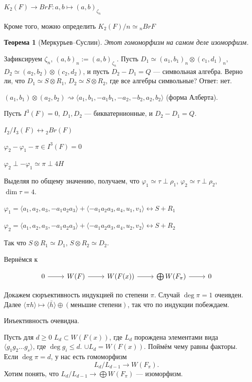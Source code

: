 \documentclass{article}
\newenvironment{cd}{\begin{equation*}\begin{tikzcd}}{\end{tikzcd}\end{equation*}}
\newtheorem*{theorem}{Теорема}
\theoremstyle{definition}
\theoremstyle{remark}
\begin{document}
$K_2(F) \rightarrow Br F: {a, b} \mapsto (a, b)_{\zeta_n}$

Кроме того, можно определить $K_2(F) / n \simeq {}_nBrF$

\begin{theorem}[Меркурьев--Суслин]
    Этот гомоморфизм на самом деле изоморфизм.
\end{theorem}

Зафиксируем $\zeta_n$, $(a, b)_n := (a, b)_{\zeta_n}$. Пусть $D_1 \simeq (a_1, b_1)_n \otimes (c_1, d_1)_n$, $D_2 \simeq (a_2, b_2) \otimes (c_2, d_2)$, и пусть $D_2 - D_1 = Q$ --- символьная алгебра. Верно ли, что $D_1 \simeq S \otimes R_1$, $D_2 \simeq S \otimes R_2$, где все алгебры символьные? Ответ: нет.

$(a_1, b_1) \otimes (a_2, b_2) \rightsquigarrow \langle a_1, b_1, -a_1b_1, -a_2, -b_2, a_2, b_2 \rangle$ (форма Алберта).

Пусть $I^3(F) = 0$, $D_1, D_2$ --- бикватернионные, и $D_2 - D_1 = Q$. 

$I_2 / I_3 (F) \leftrightarrow {}_2 Br(F)$

$\varphi_2 - \varphi_1 - \pi \in I^3(F) = 0$

$\varphi_2 \perp -\varphi_1 \simeq \pi \perp 4H$

Выделяя по общему значению, получаем, что $\varphi_1 \simeq \tau \perp \rho_1$, $\varphi_2 \simeq \tau \perp \rho_2$, $\dim \tau = 4$.

$\varphi_1 = \langle a_1, a_2, a_3, -a_1a_2a_3 \rangle + \langle -a_1a_2a_3, a_4, u_1, v_1 \rangle \leftrightarrow S + R_1$

$\varphi_2 = \langle a_1, a_2, a_3, -a_1a_2a_3 \rangle + \langle -a_1a_2a_3, a_4, u_2, v_2 \rangle \leftrightarrow S + R_2$

Так что $S \otimes R_1 \simeq D_1$, $S \otimes R_2 \simeq D_2$.

Вернёмся к

\begin{cd}
    0 \rar & W(F) \rar & W(F(x)) \rar & \bigoplus W(F_\pi) \rar & 0
\end{cd}

Докажем сюръективность индукцией по степени $\pi$. Случай $\deg \pi = 1$ очеивден. Далее $\langle \pi h \rangle \mapsto \langle \bar{h} \rangle \oplus (\text{меньшие степени})$, так что по индукции побеждаем.

Инъективность очевидна.

Пусть для $d \geq 0$ $L_d \subset W(F(x))$, где $L_d$ порождена элементами вида $\langle g_1g_2 \ldots g_s \rangle$, где $\deg g_i \leq d$. $\cup L_d = W(F(x))$. Поймём чему равны факторы. Если $\deg \pi = d$, у нас есть гомоморфизм
$$L_d / L_{d-1} \rightarrow W(F_\pi).$$
Хотим понять, что $L_d / L_{d-1} \rightarrow  \bigoplus W(F_\pi)$ --- изоморфизм.
\end{document}

